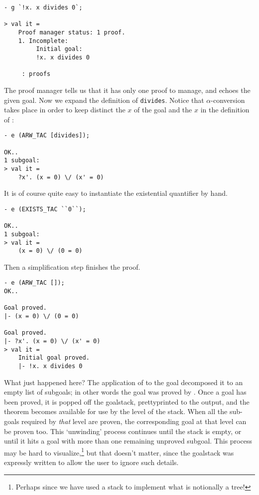 \begin{session}\begin{verbatim}
- g `!x. x divides 0`;

> val it =
    Proof manager status: 1 proof.
    1. Incomplete:
         Initial goal:
         !x. x divides 0

     : proofs
\end{verbatim}\end{session}
The proof manager tells us that it has only one proof to manage, and
echoes the given goal.  Now we expand the definition of
\verb+divides+. Notice that $\alpha$-conversion takes place in order to
keep distinct the $x$ of the goal and the $x$ in the definition of
:
\begin{session}\begin{verbatim}
- e (ARW_TAC [divides]);

OK..
1 subgoal:
> val it =
    ?x'. (x = 0) \/ (x' = 0)
\end{verbatim}\end{session}
It is of course quite easy to instantiate the existential quantifier by
hand.
\begin{session}\begin{verbatim}
- e (EXISTS_TAC ``0``);

OK..
1 subgoal:
> val it =
    (x = 0) \/ (0 = 0)
\end{verbatim}\end{session}
Then a simplification step finishes the proof.
\begin{session}\begin{verbatim}
- e (ARW_TAC []);
OK..

Goal proved.
|- (x = 0) \/ (0 = 0)

Goal proved.
|- ?x'. (x = 0) \/ (x' = 0)
> val it =
    Initial goal proved.
    |- !x. x divides 0
\end{verbatim}\end{session}

What just happened here? The application of  to the goal
decomposed it to an empty list of subgoals; in other words the goal was
proved by .  Once a goal has been proved, it is popped off
the goalstack, prettyprinted to the output, and the theorem becomes
available for use by the level of the stack. When all the sub-goals
required by {\it that\/} level are proven, the corresponding goal at
that level can be proven too.  This `unwinding' process continues until
the stack is empty, or until it hits a goal with more than one remaining
unproved subgoal. This process may be hard to
visualize,\footnote{Perhaps since we have used a stack to implement what
is notionally a tree!} but that doesn't matter, since the goalstack was
expressly written to allow the user to ignore such details.

